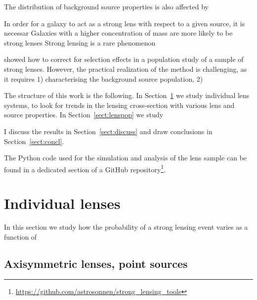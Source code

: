 \documentclass{aa}
\def\Sref#1{Section~\ref{#1}\xspace}
\begin{document}
The distribution of background source properties is also affected by 


In order for a galaxy to act as a strong lens with respect to a given source, it is necessar
Galaxies with a higher concentration of mass are more likely to be strong lenses
Strong lensing is a rare phenomenon

\citep{Son22} showed how to correct for selection effects in a population study of a sample of strong lenses. However, the practical realization of the \citep{Son22} method is challenging, as it requires 1) characterising the background source population, 2) 

The structure of this work is the following.
In \Sref{sect:indlenses} we study individual lens systems, to look for trends in the lensing cross-section with various lens and source properties.
In \Sref{sect:lenspop} we study 

I discuss the results in \Sref{sect:discuss} and draw conclusions in \Sref{sect:concl}.

The Python code used for the simulation and analysis of the lens sample can be found in a dedicated section of a GitHub repository\footnote{\url{https://github.com/astrosonnen/strong_lensing_tools}}.


\section{Individual lenses}\label{sect:indlenses}

In this section we study how the probability of a strong lensing event varies as a function of 

\subsection{Axisymmetric lenses, point sources}
\end{document}
